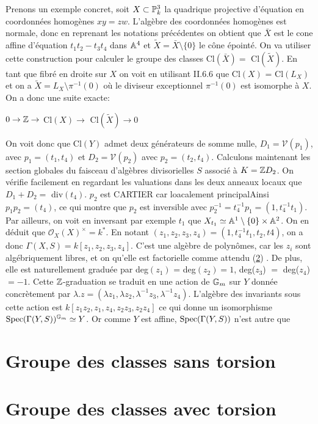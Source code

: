 Prenons un exemple concret, soit $X\subset \mathbb{P}^3_k$ la quadrique projective d'équation en coordonnées homogènes $xy=zw$. L'algèbre des coordonnées homogènes est normale, donc en reprenant les notations précédentes on obtient que $\bar{X}$ est le cone affine d'équation $t_1t_2-t_3t_4$ dans $\mathbb{A}^4$ et $\widetilde{X}=\bar{X}\setminus\lbrace 0 \rbrace$ le cône épointé. On va utiliser cette construction pour calculer le groupe des classes Cl$(\bar{X})=$ Cl$(\widetilde{X})$. En tant que fibré en droite sur $X$ on voit en utilisant\cite{Hartshorne} II.6.6 que Cl$(X)$ = Cl$(L_X)$ et on a $\widetilde{X}=L_X \setminus \pi^{-1}(0)$ où le diviseur exceptionnel $\pi^{-1}(0)$ est isomorphe à $X$. On a donc une suite exacte:
\begin{center}
$0\rightarrow \mathbb{Z}\rightarrow$ Cl$(X) \rightarrow$ Cl$(\widetilde{X}) \rightarrow 0$
\end{center}
On voit donc que Cl$(Y)$ admet deux générateurs de somme nulle, $D_1=\mathcal{V}(p_1)$, avec $p_1=(t_1,t_4)$ et $D_2=\mathcal{V}(p_2)$ avec $p_2=(t_2,t_4)$. Calculons maintenant les section globales du faisceau d'algèbres divisorielles $S$ associé à $K=\mathbb{Z} D_2$. On vérifie facilement en regardant les valuations dans les deux anneaux locaux que $D_1+D_2=$ div$(t_4)$. $p_2$ est CARTIER car loacalement principalAinsi $p_1p_2=(t_4)$, ce qui montre que $p_2$ est inversible avec $p_2^{-1}=t_4^{-1}p_1=(1, t_4^{-1}t_1)$. Par ailleurs, on voit en inversant par exemple $t_1$  que $X_{t_1}\simeq \mathbb{A}^{1}\setminus \lbrace0\rbrace\times\mathbb{A}^{2}$. On en déduit que $\mathcal{O}_X(X)^{\times}=k^*$. En notant $(z_1,z_2,z_3,z_4)=(1, t_4^{-1}t_1,t_2,t4)$, on a donc $\Gamma(X, S)=k[z_1,z_2,z_3,z_4]$. C'est une algèbre de polynômes, car les $z_i$ sont algébriquement libres, et on qu'elle est factorielle comme attendu (\ref{}) . De plus, elle est naturellement graduée par deg$(z_1)$ = deg$(z_2)=1$, deg($z_3$) $=$ deg($z_4$)$=-1$. Cette $\mathbb{Z}$-graduation se traduit en une action de $\mathbb{G}_m$ sur $Y$ donnée  concrètement par $\lambda.z=(\lambda z_1,\lambda z_2,\lambda^{-1} z_3,\lambda^{-1} z_4)$. L'algèbre des invariants sous cette action est $k[z_1z_2,z_1,z_4,z_2z_3,z_2z_4]$ ce qui donne un isomorphisme $\operatorname{Spec}(\Gamma(Y,S))^{\mathbb{G}_m}\simeq Y$. Or comme $Y$ est affine, $\operatorname{Spec}(\Gamma(Y,S))$ n'est autre que 

\section{Groupe des classes sans torsion}


\section{Groupe des classes avec torsion}
